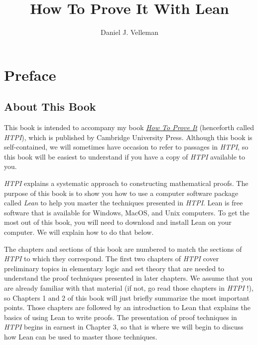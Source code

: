 \documentclass[
  letterpaper,
  DIV=11,
  numbers=noendperiod]{scrreprt}
\title{How To Prove It With Lean}
\author{Daniel J. Velleman}
\date{}
\renewcommand*\contentsname{Table of contents}
\newcommand\contentsname{Table of contents}
\begin{document}
\maketitle
\ifdefined\Shaded\renewenvironment{Shaded}{\begin{tcolorbox}[breakable, interior hidden, borderline west={3pt}{0pt}{shadecolor}, boxrule=0pt, enhanced, sharp corners, frame hidden]}{\end{tcolorbox}}\fi

\renewcommand*\contentsname{Table of contents}
{
\hypersetup{linkcolor=}
\setcounter{tocdepth}{1}
\tableofcontents
}

\hypertarget{preface}{%
\chapter*{Preface}\label{preface}}

\hypertarget{about-this-book}{%
\section*{About This Book}\label{about-this-book}}

This book is intended to accompany my book
\href{https://www.cambridge.org/highereducation/books/how-to-prove-it/6D2965D625C6836CD4A785A2C843B3DA\#overview}{\emph{How
To Prove It}} (henceforth called \emph{HTPI}), which is published by
Cambridge University Press. Although this book is self-contained, we
will sometimes have occasion to refer to passages in \emph{HTPI}, so
this book will be easiest to understand if you have a copy of
\emph{HTPI} available to you.

\emph{HTPI} explains a systematic approach to constructing mathematical
proofs. The purpose of this book is to show you how to use a computer
software package called \emph{Lean} to help you master the techniques
presented in \emph{HTPI}. Lean is free software that is available for
Windows, MacOS, and Unix computers. To get the most out of this book,
you will need to download and install Lean on your computer. We will
explain how to do that below.

The chapters and sections of this book are numbered to match the
sections of \emph{HTPI} to which they correspond. The first two chapters
of \emph{HTPI} cover preliminary topics in elementary logic and set
theory that are needed to understand the proof techniques presented in
later chapters. We assume that you are already familiar with that
material (if not, go read those chapters in \emph{HTPI} !), so Chapters
1 and 2 of this book will just briefly summarize the most important
points. Those chapters are followed by an introduction to Lean that
explains the basics of using Lean to write proofs. The presentation of
proof techniques in \emph{HTPI} begins in earnest in Chapter 3, so that
is where we will begin to discuss how Lean can be used to master those
techniques.
\end{document}
